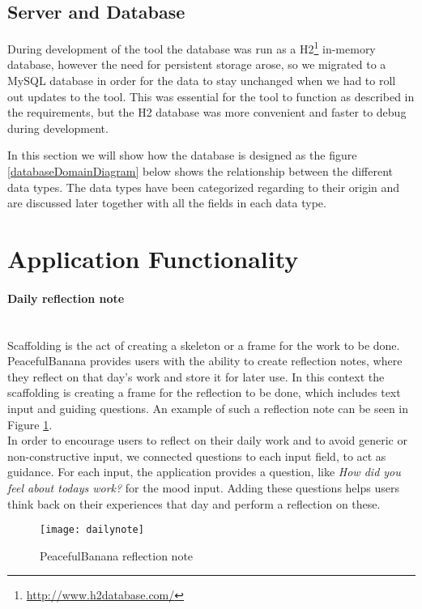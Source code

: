 \subsection{Server and Database}
During development of the tool the database was run as a H2\footnote{\url{http://www.h2database.com/}} in-memory database, however the need for persistent storage arose, so we migrated to a MySQL database in order for the data to stay unchanged when we had to roll out updates to the tool. This was essential for the tool to function as described in the requirements, but the H2 database was more convenient and faster to debug during development.

In this section we will show how the database is designed as the figure \ref{databaseDomainDiagram} below shows the relationship between the different data types. The data types have been categorized regarding to their origin and are discussed later together with all the fields in each data type.



\section{Application Functionality}
\paragraph{Daily reflection note}\mbox{}\\
Scaffolding is the act of creating a skeleton or a frame for the work to be done.
PeacefulBanana provides users with the ability to create reflection notes, where they reflect on that day's work and store it for later use. In this context the scaffolding is creating a frame for the reflection to be done, which includes text input and guiding questions. An example of such a reflection note can be seen in Figure \ref{dailynotefunc}. \\
In order to encourage users to reflect on their daily work and to avoid generic or non-constructive input, we connected questions to each input field, to act as guidance. For each input, the application provides a question, like \emph{How did you feel about todays work?} for the mood input. Adding these questions helps users think back on their experiences that day and perform a reflection on these. 
\begin{figure}[H]
    \centering
        \texttt{[image: dailynote]}
    \caption{PeacefulBanana reflection note}
    \label{dailynotefunc}
\end{figure}

